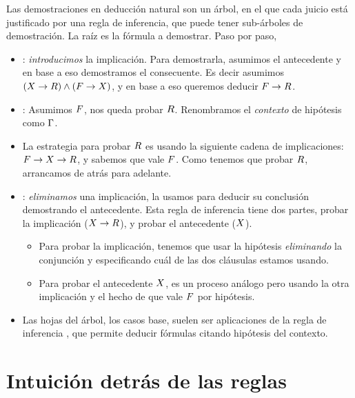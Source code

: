 \begin{ejemplo}
    Las demostraciones en deducción natural son un árbol, en el que cada juicio está justificado por una regla de inferencia, que puede tener sub-árboles de demostración. La raíz es la fórmula a demostrar. Paso por paso,

    \begin{itemize}
        \item {}: \textit{introducimos} la implicación. Para demostrarla,
        asumimos el antecedente y en base a eso demostramos el consecuente. Es
        decir asumimos $(X \to R) \wedge (F \to
        X)$, y en base a eso queremos deducir $F \to R$.
        \item {}: Asumimos $F$, nos queda probar $R$.
        Renombramos el \textit{contexto} de hipótesis como $\Gamma$.
        \item La estrategia para probar $R$ es usando la siguiente cadena
        de implicaciones: $F \to X \to R$, y sabemos que
        vale $F$. Como tenemos que probar $R$, arrancamos de atrás para
        adelante.
        \item {}: \textit{eliminamos} una implicación, la usamos para
        deducir su conclusión demostrando el antecedente. Esta regla de
        inferencia tiene dos partes, probar la implicación ($X \to
        R$), y probar el antecedente ($X$).
        \begin{itemize}
            \item Para probar la implicación, tenemos que usar la hipótesis \textit{eliminando} la conjunción y especificando cuál
            de las dos cláusulas estamos usando.
            \item Para probar el antecedente $X$, es un proceso análogo
            pero usando la otra implicación y el hecho de que vale $F$ por hipótesis.
        \end{itemize}
        \item Las hojas del árbol, los casos base, suelen ser aplicaciones de
        la regla de inferencia , que permite deducir fórmulas citando
        hipótesis del contexto.
    \end{itemize}
\end{ejemplo}

\section{Intuición detrás de las reglas}


